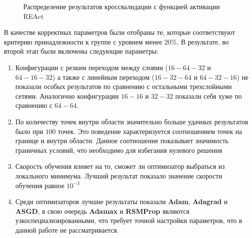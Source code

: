\begin{figure}[ht]
    \centering
    \caption{Распределение результатов кроссвалидации с функцией активации REAct}
    \label{fig:couette_react_stat}
\end{figure}

В качестве корректных параметров были отобраны те, которые соответствуют критерию
принадлежности к группе с уровнем менее 20\%. В результате, во второй этап были
включены следующие параметры:
\begin{enumerate}
    \item Конфигурации с резким переходом между слоями ($16-64-32$ и $64-16-32$) а также
    с линейным переходом ($16-32-64$ и $64-32-16$) не показали особых результатов по
    сравнению с остальными трехслойными сетями. Аналогично конфигурации
    $16-16$ и $32-32$ показали себя хуже по сравнению с $64-64$.
    \item По количеству точек внутри области значительно больше удачных
    результатов было при $100$ точек. Это поведение характеризуется 
    соотношением точек на границе и внутри области. Данное соотношение 
    показывает значимость граничных условий, что необходимо для избегания
    нулевого решения
    \item Скорость обучения влияет на то, сможет ли оптимизатор 
    выбраться из локального минимума. Лучший результат показало значение
    скорости обучения равное $10^{-3}$
    \item Среди оптимизаторов лучшие результаты показали \textbf{Adam}, \textbf{Adagrad} и
    \textbf{ASGD}, в свою очередь \textbf{Adamax} и \textbf{RSMProp} являются узкоспециализированными,
    что требует точной настройки параметров, что в данной работе не рассматривается.
\end{enumerate} 

